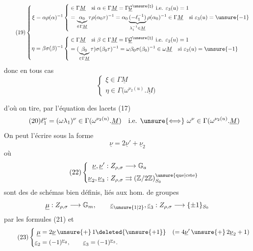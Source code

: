 \[
\tag{19}
\left\{
\begin{aligned}
\xi=\alpha\rho(\alpha)^{-1}
&\left\{
\begin{aligned}
&\in\Gamma\underline M\quad\text{si }\alpha\in\Gamma\underline M=\Gamma\underline{\mathcal G}^{\unsure{\natural}}\ \text{i.e. }\varepsilon_3(u)=1\\
&=\underbrace{\alpha_0}_{\in\Gamma\underline M}\tau\rho(\alpha_0\tau)^{-1}
=\alpha_0\underbrace{(-\ell_1^{-1})}_{\lambda_1^{-1}\in\underline M}\rho(\alpha_0)^{-1}\in\Gamma\underline M\quad\text{si }\varepsilon_3(u)=\unsure{-1}
\end{aligned}\right.\\[1ex]
\eta=\beta\sigma(\beta)^{-1}
&\left\{
\begin{aligned}
&\in\Gamma\underline M\quad\text{si }\beta\in\Gamma\underline M=\Gamma\underline{\mathcal G}^{\unsure{\natural}}\ \text{i.e. }\varepsilon_2(u)=1\\
&=(\underbrace{\beta_0}_{\in\Gamma\underline M}\tau)\sigma(\beta_0\tau)^{-1}
=\omega\beta_0\sigma(\beta_0)^{-1}\in\omega\underline M\quad\text{si }\varepsilon_2(u)=\unsure{-1}
\end{aligned}\right.
\end{aligned}\right.
\]
donc en tous cas
\[
\tag{19 bis}
\begin{cases}
\xi\in\Gamma\underline M\\
\eta\in\Gamma\bigl(\omega^{\nu_2(u)}.\underline{M}\bigr)
\end{cases}
\]


d'où on tire, par l'équation des lacets (17)
\[
\tag{20}
\ell_1^{\nu}=(\omega\lambda_1)^{\nu}\in\Gamma(\omega^{\nu_2(u)}.\underline M)
\quad\text{i.e. }\unsure{\Longleftrightarrow}\ \omega^{\nu}\in\Gamma(\omega^{\nu_2(u)}.\underline M)
\]
On peut l'écrire sous la forme
\[
\tag{21}
\underline\nu=2\underline\nu'+\underline\nu_2
\]
où
\[
\tag{22}
\left\{
\begin{aligned}
\underline\nu,\underline\nu' &: Z_{\rho,\sigma}\longrightarrow\mathbb G_a\\
\underline\nu_2,\underline\nu_3 &: Z_{\rho,\sigma}\rightrightarrows
(\mathbb Z/2\mathbb Z)_{S_0}^{\unsure{\mathrm{que}|\mathrm{cste}}}
\end{aligned}\right.
\]
\deleted{$\unsure{\varepsilon}$}
sont des  de schémas bien définis, liés  aux hom. de groupes \deleted{$\unsure{\mu}$}
\[
\underline\mu:Z_{\rho,\sigma}\longrightarrow\mathbb G_m,\qquad
\underline\varepsilon_{\unsure{1|2}},\underline\varepsilon_3:Z_{\rho,\sigma}\longrightarrow\{\pm1\}_{S_0}
\]
par les formules (21) et
\[
\tag{23}
\left\{
\begin{aligned}
\underline\mu&=2\underline\nu\,\unsure{+}\,1\deleted{\unsure{+1}}
\quad(=4\underline\nu'\,\unsure{+}\,2\underline\nu_2+1)\\
\underline\varepsilon_2&=(-1)^{\underline\nu_2},\qquad
\underline\varepsilon_3=(-1)^{\underline\nu_3}.
\end{aligned}\right.
\]

